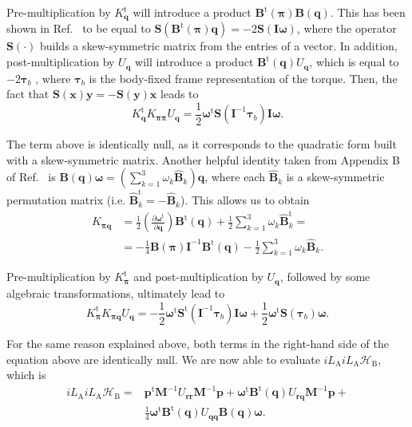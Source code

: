 \documentclass[
journal=jctcce,
layout=twocolumn
]{achemso}
\newcommand{\mt}[1]{\boldsymbol{\mathbf{#1}}}   %
\newcommand{\vt}[1]{\boldsymbol{\mathbf{#1}}}   %
\newcommand{\tr}[1]{#1^\text{t}}                %
\newcommand{\diff}[2]{\frac{\partial #1}{\partial #2}} %
\newcommand{\Ham}[1]{{\mathcal H}_\text{#1}}    %
\newcommand{\Liu}[1]{i\!L_\text{#1}}            %
\begin{document}
Pre-multiplication by $\tr{K_{\vt q}}$ will introduce a product $\tr{\mt B}(\vt \pi) {\mt B}(\vt q)$.
This has been shown in Ref.~ to be equal to ${\mt S}\left( \tr{\mt B}(\vt \pi) {\vt q} \right) = -2 {\mt S}({\mt I} {\vt \omega})$, where the operator ${\mt S}(\cdot)$ builds a skew-symmetric matrix from the entries of a vector.
In addition, post-multiplication by $U_{\vt q}$ will introduce a product $\tr{\mt B}(\vt q) U_{\vt q}$, which is equal to $-2 {\vt \tau}_b$ \cite{Silveira_2017}, where ${\vt \tau}_b$ is the body-fixed frame representation of the torque.
Then, the fact that ${\mt S}(\vt x) {\vt y} = -{\mt S}(\vt y) {\vt x}$ leads to
\begin{equation*}
\tr{K_{\vt q}} K_{\vt \pi \vt \pi} U_{\vt q} = \frac{1}{2} \tr{\vt \omega} {\mt S}({\mt I}^{-1} {\vt \tau}_b) {\mt I} {\vt \omega}.
\end{equation*}

The term above is identically null, as it corresponds to the quadratic form built with a skew-symmetric matrix.
Another helpful identity taken from Appendix B of Ref.~ is ${\mt B}(\vt q){\vt \omega} = ( \sum_{k=1}^3 \omega_k \hat{\mt B}_k ) \vt q$, where each $\hat{\mt B}_k$ is a skew-symmetric permutation matrix (i.e. $\tr{\hat{\mt B}}_k = -\hat{\mt B}_k$).
This allows us to obtain
\begin{align*}
K_{\vt \pi \vt q} &= \frac{1}{2} \left(\diff{\tr{\vt \omega}}{\vt q}\right) \tr{\mt B}(\vt q) + \frac{1}{2} \sum_{k=1}^3 \omega_k \tr{\hat{\mt B}}_k = \\
&= -\frac{1}{4} {\mt B}(\vt \pi) {\mt I}^{-1} \tr{\mt B}(\vt q) - \frac{1}{2} \sum_{k=1}^3 \omega_k \hat{\mt B}_k.
\end{align*}

Pre-multiplication by $\tr{K_{\vt \pi}}$ and post-multiplication by $U_{\vt q}$, followed by some algebraic transformations, ultimately lead to
\begin{equation*}
\tr{K_{\vt \pi}} K_{\vt \pi \vt q} U_{\vt q} = -\frac{1}{2} \tr{\vt \omega} \tr{\mt S}({\mt I}^{-1} {\vt \tau}_b) {\mt I} {\vt \omega} + \frac{1}{2} \tr{\vt \omega} {\mt S}({\vt \tau}_b){\vt \omega}.
\end{equation*}

For the same reason explained above, both terms in the right-hand side of the equation above are identically null.
We are now able to evaluate $\Liu A \Liu A \Ham B $, which is
\begin{align*}
\Liu A \Liu A \Ham B = &\tr{\vt p} {\mt M}^{-1} U_{\vt r \vt r} {\mt M}^{-1} {\vt p} + \tr{\vt \omega} \tr{\mt B}(\vt q) U_{\vt r \vt q} {\mt M}^{-1} {\vt p}
+ \\
&\frac{1}{4} \tr{\vt \omega} \tr{\mt B}(\vt q) U_{\vt q \vt q} {\mt B}(\vt q) \vt \omega.
\end{align*}
\end{document}
